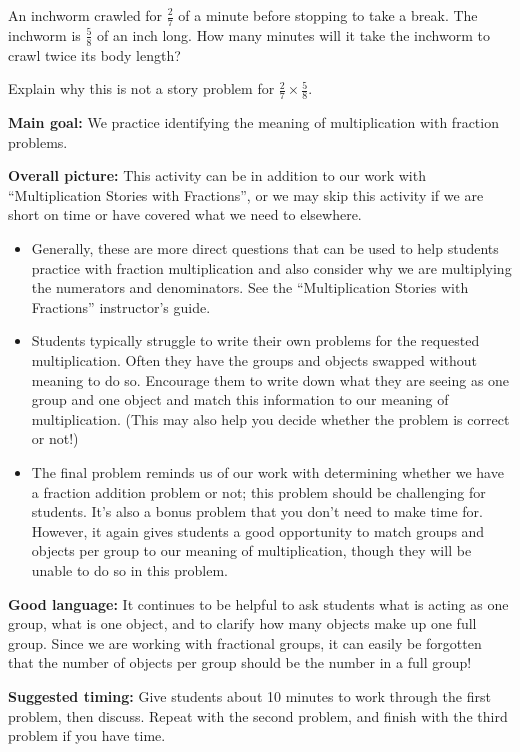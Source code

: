 \documentclass[nooutcomes,noauthor]{ximera}
\begin{document}
\begin{problem}
An inchworm crawled for $\frac{2}{7}$ of a minute before stopping to take a break. The inchworm is $\frac{5}{8}$ of an inch long. How many minutes will it take the inchworm to crawl twice its body length?

Explain why this is not a story problem for $\frac{2}{7} \times \frac{5}{8}$. 
\end{problem}




\newpage

\begin{instructorNotes} 



{\bf Main goal:} We practice identifying the meaning of multiplication with fraction problems.


{\bf Overall picture:} This activity can be in addition to our work with ``Multiplication Stories with Fractions'', or we may skip this activity if we are short on time or have covered what we need to elsewhere.

\begin{itemize}
	\item Generally, these are more direct questions that can be used to help students practice with fraction multiplication and also consider why we are multiplying the numerators and denominators. See the ``Multiplication Stories with Fractions'' instructor's guide.
	\item Students typically struggle to write their own problems for the requested multiplication. Often they have the groups and objects swapped without meaning to do so. Encourage them to write down what they are seeing as one group and one object and match this information to our meaning of multiplication. (This may also help you decide whether the problem is correct or not!)
	\item The final problem reminds us of our work with determining whether we have a fraction addition problem or not; this problem should be challenging for students. It's also a bonus problem that you don't need to make time for. However, it again gives students a good opportunity to match groups and objects per group to our meaning of multiplication, though they will be unable to do so in this problem.
\end{itemize}


{\bf Good language:}  It continues to be helpful to ask students what is acting as one group, what is one object, and to clarify how many objects make up one full group. Since we are working with fractional groups, it can easily be forgotten that the number of objects per group should be the number in a full group!


{\bf Suggested timing:} Give students about 10 minutes to work through the first problem, then discuss. Repeat with the second problem, and finish with the third problem if you have time.




\end{instructorNotes}
\end{document}
